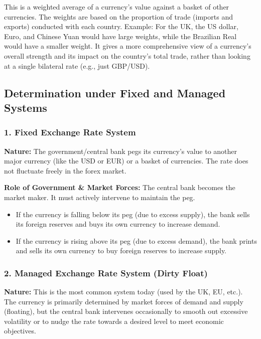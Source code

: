 \documentclass[11pt, a4paper, twoside]{book}
\begin{document}
This is a weighted average of a currency's value against a basket of other currencies. The weights are based on the proportion of trade (imports and exports) conducted with each country. Example: For the UK, the US dollar, Euro, and Chinese Yuan would have large weights, while the Brazilian Real would have a smaller weight. It gives a more comprehensive view of a currency's overall strength and its impact on the country's total trade, rather than looking at a single bilateral rate (e.g., just GBP/USD).

\subsection{Determination under Fixed and Managed Systems}

\subsubsection{1. Fixed Exchange Rate System}

\textbf{Nature:} The government/central bank pegs its currency's value to another major currency (like the USD or EUR) or a basket of currencies. The rate does not fluctuate freely in the forex market.

\textbf{Role of Government \& Market Forces:} The central bank becomes the market maker. It must actively intervene to maintain the peg.
\begin{itemize}
  \item If the currency is falling below its peg (due to excess supply), the bank sells its foreign reserves and buys its own currency to increase demand.
  \item If the currency is rising above its peg (due to excess demand), the bank prints and sells its own currency to buy foreign reserves to increase supply.
\end{itemize}

\subsubsection{2. Managed Exchange Rate System (Dirty Float)}

\textbf{Nature:} This is the most common system today (used by the UK, EU, etc.). The currency is primarily determined by market forces of demand and supply (floating), but the central bank intervenes occasionally to smooth out excessive volatility or to nudge the rate towards a desired level to meet economic objectives.
\end{document}
